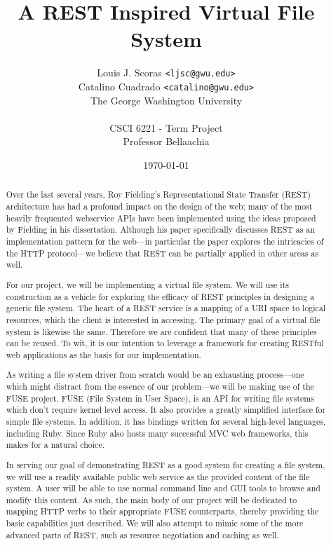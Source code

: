 \documentclass{article}
\begin{document}
\renewcommand{\bfdefault}{sbc}

\title{A REST Inspired Virtual File System}
\author{Louis J. Scoras \texttt{<ljsc@gwu.edu>}\\
Catalino Cuadrado \texttt{<catalino@gwu.edu>}\\
The George Washington University\\
\\
CSCI 6221 - Term Project\\
Professor Bellaachia}
\date{\today}
\maketitle

\begin{abstract}

Over the last several years, Roy Fielding's Representational State Transfer
(REST) architecture \nocite{Fie00} has had a profound impact on the design of
the web; many of the most heavily frequented webservice APIs have been
implemented using the ideas proposed by Fielding in his dissertation. Although
his paper specifically discusses REST as an implementation pattern for the
web---in particular the paper explores the intricacies of the HTTP protocol---we
believe that REST can be partially applied in other areas as well.

For our project, we will be implementing a virtual file system. We will use its
construction as a vehicle for exploring the efficacy of REST principles in
designing a generic file system. The heart of a REST service is a mapping of a
URI space to logical resources, which the client is interested in accessing.
The primary goal of a virtual file system is likewise the same. Therefore we are
confident that many of these principles can be reused. To wit, it is our
intention to leverage a framework for creating RESTful web applications as the
basis for our implementation.

As writing a file system driver from scratch would be an exhausting
process---one which might distract from the essence of our problem---we will be
making use of the FUSE project. FUSE (File System in User Space), is an API for
writing file systems which don't require kernel level access. It also provides a
greatly simplified interface for simple file systems. In addition, it has
bindings written for several high-level languages, including Ruby. Since Ruby
also hosts many successful MVC web frameworks, this makes for a natural choice.

In serving our goal of demonstrating REST as a good system for creating a file
system, we will use a readily available public web service as the provided
content of the file system. A user will be able to use normal command line and
GUI tools to browse and modify this content. As such, the main body of our
project will be dedicated to mapping HTTP verbs to their appropriate FUSE
counterparts, thereby providing the basic capabilities just described. We will
also attempt to mimic some of the more advanced parts of REST, such as resource
negotiation and caching as well.

\end{abstract}

\clearpage
\tableofcontents








\end{document}
